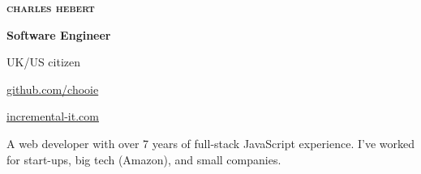\begin{center}
  \begin{lsstyle}
    {\Huge \scshape \bfseries charles hebert}
  \end{lsstyle}

  \vspace*{0.5em}

  \textbf{Software Engineer}

  UK/US citizen
\end{center}

\begin{small}

\noindent
\begin{minipage}[t]{0.6\textwidth}
\end{minipage}
\noindent
\noindent
\begin{minipage}[t]{0.4\textwidth}
  \begin{description}
    \raggedleft
    \item[My code] \href{https://www.github.com/chooie}{github.com/chooie}
    \item[Website]
      \href{https://incremental-it.com}{incremental-it.com}
  \end{description}
\end{minipage}

\end{small}

\vspace{1.5em}

\noindent
A web developer with over 7 years of full-stack JavaScript experience. I've
worked for start-ups, big tech (Amazon), and small companies.
\vspace{1.5em}

